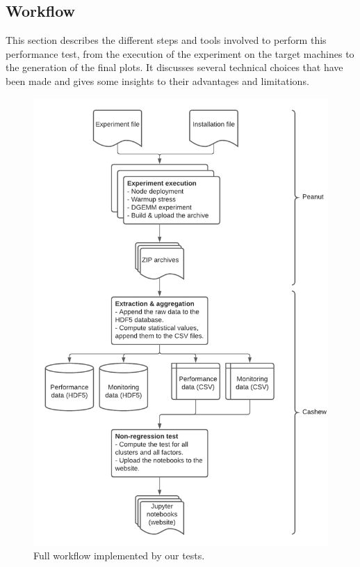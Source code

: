         \subsection{Workflow}%
        \label{sub:workflow}

            This section describes the different steps and tools involved to perform this performance test, from the
            execution of the experiment on the target machines to the generation of the final plots. It discusses
            several technical choices that have been made and gives some insights to their advantages and limitations.

            \begin{figure}[htpb]
                \centering
                \includegraphics[width=\textwidth,height=\textheight,keepaspectratio]{img/experiment/non_regression/implementation/workflow.pdf}
                \caption{Full workflow implemented by our tests.}%
                \label{fig:experiment:g5k_test:workflow}
            \end{figure}

